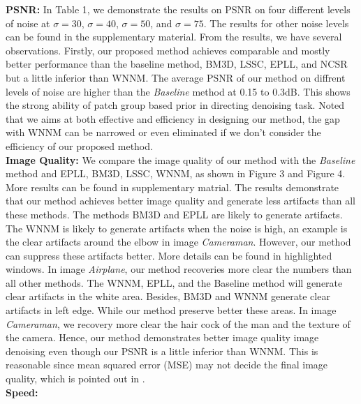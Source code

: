 \documentclass[10pt,twocolumn,letterpaper]{article}
\begin{document}
\textbf{PSNR:}
In Table 1, we demonstrate the results on PSNR on four different levels of noise at $\sigma = 30$, $\sigma = 40$, $\sigma = 50$, and $\sigma = 75$. The results for other noise levels can be found in the supplementary material. From the results, we have several observations. Firstly, our proposed method achieves comparable and mostly better performance than the baseline method, BM3D, LSSC, EPLL\cite{epll}, and NCSR but a little inferior than WNNM. The average PSNR of our method on diffrent levels of noise are higher than the \textsl{Baseline} method at 0.15 to 0.3dB. This shows the strong ability of patch group based prior in directing denoising task. Noted that we aims at both effective and efficiency in designing our method, the gap with WNNM can be narrowed or even eliminated if we don't consider the efficiency of our proposed method.
\\
\textbf{Image Quality:}
We compare the image quality of our method with the \textsl{Baseline} method and EPLL\cite{epll}, BM3D\cite{bm3d}, LSSC\cite{lssc}, WNNM\cite{wnnm}, as shown in Figure 3 and Figure 4. More results can be found in supplementary matrial. The results demonstrate that our method achieves better image quality and generate less artifacts than all these methods. The methods BM3D and EPLL are likely to generate artifacts. The WNNM is likely to generate artifacts when the noise is high, an example is the clear artifacts around the elbow in image \textsl{Cameraman}. However, our method can suppress these artifacts better. More details can be found in highlighted windows. In image \textsl{Airplane}, our method recoveries more clear the numbers than all other methods. The WNNM, EPLL, and the Baseline method will generate clear artifacts in the white area. Besides, BM3D and WNNM generate clear artifacts in left edge. While our method preserve better these areas. In image \textsl{Cameraman}, we recovery more clear the hair cock of the man and the texture of the camera. Hence, our method demonstrates better image quality image denoising even though our PSNR is a little inferior than WNNM. This is reasonable since mean squared error (MSE) may not decide the final image quality, which is pointed out in \cite{ssim}.
\\
\textbf{Speed:}
\end{document}
